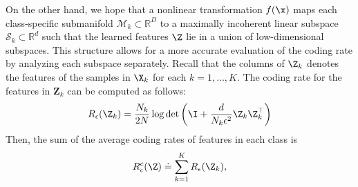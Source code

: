 \documentclass[../../book-main.tex]{subfiles}
\begin{document}
On the other hand, we hope that a nonlinear transformation $f(\x)$ maps each class-specific submanifold $\mathcal{M}_k \subset \mathbb{R}^D$ to a maximally incoherent linear subspace $\mathcal{S}_k \subset \mathbb{R}^d$ such that the learned features $\Z$ lie in a union of low-dimensional subspaces. This structure allows for a more accurate evaluation of the coding rate by analyzing each subspace separately. %
Recall that the columns of $\Z_k$ denotes the features of the samples in $\X_k$ for each $k=1,\dots,K$. The coding rate for the features in $\bm Z_k$ can be computed as follows: 
\begin{align}
    R_{\epsilon}(\Z_k) = \frac{N_k}{2N}\log\det\left(\I + \frac{d}{N_k\epsilon^{2}}\Z_k\Z_k^{\top}\right)
\end{align}
Then, the sum of the average coding rates of features in each class is 
\begin{equation}
	 R_{\epsilon}^c(\Z) \doteq \sum_{k=1}^K R_{\epsilon}(\Z_k),
	\label{chap4-eqn:compress-loss-eval}
\end{equation}
\end{document}
